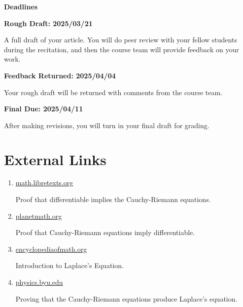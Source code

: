 \documentclass{article}
\begin{document}
    \par\hfill\par
    \textbf{\Large{Deadlines}}
    \par\hfill\par
    \textbf{Rough Draft: 2025/03/21}
    \par
    A full draft of your article. You will do peer review with your fellow
    students during the recitation, and then the course team will provide
    feedback on your work.
    \par\hfill\par
    \textbf{Feedback Returned: 2025/04/04}
    \par
    Your rough draft will be returned with comments from the course team.
    \par\hfill\par
    \textbf{Final Due: 2025/04/11}
    \par
    After making revisions, you will turn in your final draft for grading.
    \par\hfill\par
    \section*{External Links}
    \def\libretextURL{%
        https://math.libretexts.org/%
            Bookshelves/%
                Analysis/%
                    Complex_Variables_with_Applications_(Orloff)/%
                        02\%3A_Analytic_Functions/%
                            2.06\%3A_Cauchy-Riemann_Equations%
    }
    \def\planetMathURL{%
        https://planetmath.org/ProofOfTheCauchyRiemannEquations%
    }
    \def\encyclopediaURL{%
        https://encyclopediaofmath.org/index.php?title=Laplace_equation%
    }
    \def\byuURL{%
        https://physics.byu.edu/%
            faculty/%
                berrondo/%
                    docs/%
                        physics-441/%
                            laplace.pdf%
    }
    \begin{enumerate}
        \item
            \href{\libretextURL}{math.libretexts.org}
            \par
            Proof that differentiable implies the Cauchy-Riemann equations.
        \item
            \href{\planetMathURL}{planetmath.org}
            \par
            Proof that Cauchy-Riemann equations imply differentiable.
        \item
            \href{\encyclopediaURL}{encyclopediaofmath.org}
            \par
            Introduction to Laplace's Equation.
        \item
            \href{\byuURL}{physics.byu.edu}
            \par
            Proving that the Cauchy-Riemann equations
            produce Laplace's equation.
    \end{enumerate}
\end{document}
